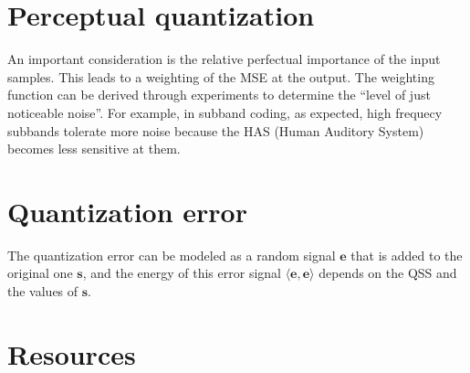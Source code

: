 \section{Perceptual quantization}

An important consideration is the relative perfectual importance of
the input samples. This leads to a weighting of the MSE at the
output. The weighting function can be derived through experiments to
determine the ``level of just noticeable noise''. For example, in
subband coding, as expected, high frequecy subbands tolerate more
noise because the HAS (Human Auditory System) becomes less sensitive
at them.


\section{Quantization error}
The quantization error can be modeled as a random signal $\mathbf{e}$
that is added to the original one $\mathbf{s}$, and the energy of this
error signal $\langle \mathbf{e},\mathbf{e}\rangle$ depends on
the QSS and the values of $\mathbf{s}$.

\section{Resources}

